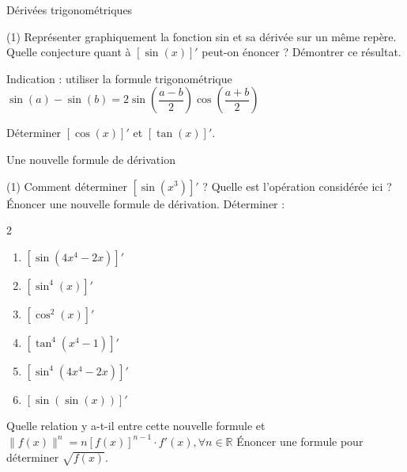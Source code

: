 \documentclass[a4paper,12pt]{article}
\begin{document}
\begin{activite}{Dérivées trigonométriques}
\tcblower
\begin{tasks}(1)
\task Représenter graphiquement la fonction sin et sa dérivée sur un même repère.
\task Quelle conjecture quant à $[\sin(x)]'$ peut-on énoncer ?
\task Démontrer ce résultat.

Indication : utiliser la formule trigonométrique $\sin(a) - \sin(b) = 2\sin\left(\dfrac{a-b}{2}\right)\cos\left(\dfrac{a+b}{2}\right)$

\task Déterminer $[\cos(x)]'$ et $[\tan(x)]'$.
\end{tasks}
\end{activite}
\begin{activite}{Une nouvelle formule de dérivation}
\tcblower
\begin{tasks}(1)
\task Comment déterminer $[\sin(x^3)]'$ ? Quelle est l'opération considérée ici ?
\task Énoncer une nouvelle formule de dérivation.
\task Déterminer :
\begin{multicols}{2}
\begin{enumerate}
\item $[\sin(4x^4-2x)]'$
\item $[\sin^4(x)]'$
\item $[\cos^2(x)]'$
\item $[\tan^4(x^4-1)]'$
\item $[\sin^4(4x^4-2x)]'$
\item $[\sin(\sin(x))]'$
\end{enumerate}
\end{multicols}
\task Quelle relation y a-t-il entre cette nouvelle formule et $\|f(x)\|^n = n[f(x)]^{n-1} \cdot f'(x), \forall n \in \mathbb{R}$
\task Énoncer une formule pour déterminer $\sqrt{f(x)}$.
\end{tasks}
\end{activite}
\end{document}
